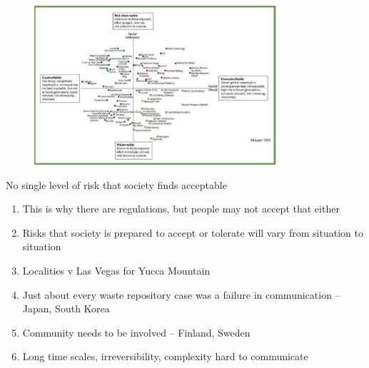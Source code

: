 \documentclass[aspectratio=1610,pdftex,dvipsnames,compress,xcolor={dvipsnames}]{beamer}
\begin{document}
\begin{frame}{}
    \begin{figure}
        \centering
        \includegraphics[width=0.80\textwidth]{risk.chart.jpg}
    \end{figure}
\end{frame}


\begin{frame}{No single level of risk that society finds acceptable}
    \begin{enumerate}[series=outerlist,topsep=0pt,itemsep=15pt,leftmargin=*,label=(\arabic*)]
        \item[]This is why there are regulations, but people may not accept that either
        \item[]Risks that society is prepared to accept or tolerate will vary from situation to situation
        \item[]Localities v Las Vegas for Yucca Mountain  
        \item[]Just about every waste repository case was a failure in communication -- Japan, South Korea 
        \item[]Community needs to be involved -- Finland, Sweden
        \item[]Long time scales, irreversibility, complexity hard to communicate
    \end{enumerate}
\end{frame}
\end{document}
